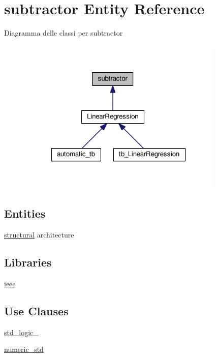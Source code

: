 \hypertarget{classsubtractor}{}\section{subtractor Entity Reference}
\label{classsubtractor}


Diagramma delle classi per subtractor\nopagebreak
\begin{figure}[H]
\begin{center}
\leavevmode
\includegraphics[width=278pt]{classsubtractor__inherit__graph}
\end{center}
\end{figure}
\subsection*{Entities}
\begin{DoxyCompactItemize}
\item 
\hyperlink{classsubtractor_1_1structural}{structural} architecture
\end{DoxyCompactItemize}
\subsection*{Libraries}
 \begin{DoxyCompactItemize}
\item 
\hyperlink{group___subtractor_ga0a6af6eef40212dbaf130d57ce711256}{ieee} 
\end{DoxyCompactItemize}
\subsection*{Use Clauses}
 \begin{DoxyCompactItemize}
\item 
\hyperlink{group___subtractor_gacd03516902501cd1c7296a98e22c6fcb}{std\+\_\+logic\+\_}   
\item 
\hyperlink{group___subtractor_ga2edc34402b573437d5f25fa90ba4013e}{numeric\+\_\+std}   
\end{DoxyCompactItemize}
